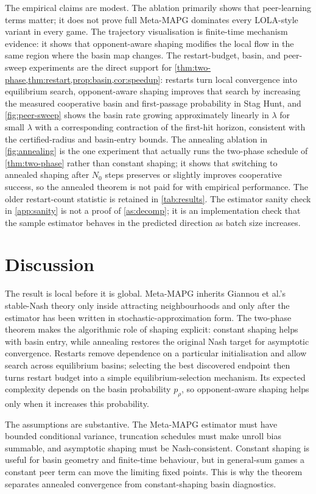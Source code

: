 \documentclass{article}
\theoremstyle{plain}
\theoremstyle{definition}
\theoremstyle{remark}
\begin{document}
The empirical claims are modest. The ablation primarily shows that peer-learning terms matter; it does not prove full Meta-MAPG dominates every LOLA-style variant in every game. The trajectory visualisation is finite-time mechanism evidence: it shows that opponent-aware shaping modifies the local flow in the same region where the basin map changes. The restart-budget, basin, and peer-sweep experiments are the direct support for \cref{thm:two-phase,thm:restart,prop:basin,cor:speedup}: restarts turn local convergence into equilibrium search, opponent-aware shaping improves that search by increasing the measured cooperative basin and first-passage probability in Stag Hunt, and \cref{fig:peer-sweep} shows the basin rate growing approximately linearly in $\lambda$ for small $\lambda$ with a corresponding contraction of the first-hit horizon, consistent with the certified-radius and basin-entry bounds. The annealing ablation in \cref{fig:annealing} is the one experiment that actually runs the two-phase schedule of \cref{thm:two-phase} rather than constant shaping; it shows that switching to annealed shaping after $N_0$ steps preserves or slightly improves cooperative success, so the annealed theorem is not paid for with empirical performance. The older restart-count statistic is retained in \cref{tab:results}. The estimator sanity check in \cref{app:sanity} is not a proof of \cref{as:decomp}; it is an implementation check that the sample estimator behaves in the predicted direction as batch size increases.

\section{Discussion}

The result is local before it is global. Meta-MAPG inherits Giannou et al.'s stable-Nash theory only inside attracting neighbourhoods and only after the estimator has been written in stochastic-approximation form. The two-phase theorem makes the algorithmic role of shaping explicit: constant shaping helps with basin entry, while annealing restores the original Nash target for asymptotic convergence. Restarts remove dependence on a particular initialisation and allow search across equilibrium basins; selecting the best discovered endpoint then turns restart budget into a simple equilibrium-selection mechanism. Its expected complexity depends on the basin probability $p_\rho$, so opponent-aware shaping helps only when it increases this probability.

The assumptions are substantive. The Meta-MAPG estimator must have bounded conditional variance, truncation schedules must make unroll bias summable, and asymptotic shaping must be Nash-consistent. Constant shaping is useful for basin geometry and finite-time behaviour, but in general-sum games a constant peer term can move the limiting fixed points. This is why the theorem separates annealed convergence from constant-shaping basin diagnostics.
\end{document}
